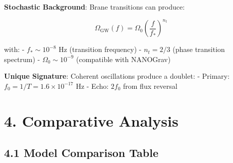 \documentclass[
  11pt,
]{report}
\begin{document}
\textbf{Stochastic Background}: Brane transitions can produce:

\[\Omega_\text{GW}(f) = \Omega_0 \left(\frac{f}{f_*}\right)^{n_t}\]

with: - \(f_* \sim 10^{-8}\) Hz (transition frequency) - \(n_t = 2/3\)
(phase transition spectrum) - \(\Omega_0 \sim 10^{-9}\) (compatible with
NANOGrav)

\textbf{Unique Signature}: Coherent oscillations produce a doublet: -
Primary: \(f_0 = 1/T = 1.6 \times 10^{-17}\) Hz - Echo: \(2f_0\) from
flux reversal

\section{4. Comparative Analysis}\label{comparative-analysis}

\subsection{4.1 Model Comparison Table}\label{model-comparison-table}
\end{document}

